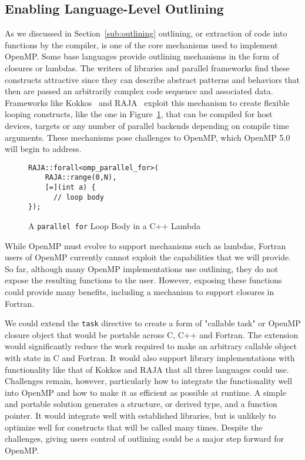 \subsection{Enabling Language-Level Outlining}
\label{sub:enabling_language_level_outlining}

As we discussed in Section~\ref{sub:outlining} outlining, or extraction 
of code into functions by the compiler, is one of the core mechanisms 
used to implement OpenMP. Some base languages provide outlining mechanisms 
in the form of closures or lambdas. The writers of libraries and parallel 
frameworks find these constructs attractive since they can describe abstract 
patterns and behaviors that then are passed an arbitrarily complex code 
sequence and associated data. Frameworks like Kokkos~\cite{kokkos} and 
RAJA~\cite{raja} exploit this mechanism to create flexible looping constructs, 
like the one in Figure~\ref{fig:raja}, that can be compiled for host devices, 
targets or any number of parallel backends depending on compile time arguments.
These mechanisms pose challenges to OpenMP, which OpenMP 5.0 will begin to
address.

\begin{figure}
\begin{verbatim}
RAJA::forall<omp_parallel_for>(
    RAJA::range(0,N),
    [=](int a) {
      // loop body
});
\end{verbatim}
\caption{A \texttt{parallel for} Loop Body in a C++ Lambda}
\label{fig:raja}
\end{figure}
   
While OpenMP must evolve to support mechanisms such as lambdas, Fortran
users of OpenMP currently cannot exploit the capabilities that we will 
provide. So far, although many OpenMP implementations use outlining, they 
do not expose the resulting functions to the user. However, exposing these 
functions could provide many benefits, including a mechanism to support
closures in Fortran.
 
We could extend the \texttt{task} directive to create a form 
of "callable task" or OpenMP closure object that would be portable across 
C, C++ and Fortran. The extension would significantly reduce the work 
required to make an arbitrary callable object with state in C and Fortran.
It would also support library implementations with functionality like that 
of Kokkos and RAJA that all three languages could use. Challenges remain,
however, particularly how to integrate the functionality well into OpenMP 
and how to make it as efficient as possible at runtime. A simple and 
portable solution generates a structure, or derived type, and a function 
pointer. It would integrate well with established libraries, but is unlikely 
to optimize well for constructs that will be called many times. Despite 
the challenges, giving users control of outlining could be
a major step forward for OpenMP.


